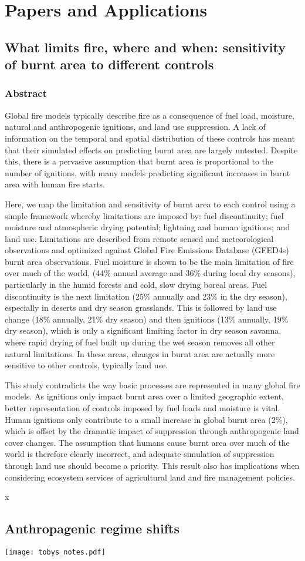 \section{Papers and Applications}

\subsection{What limits fire, where and when: sensitivity of burnt area to different controls}

\subsubsection{Abstract}
Global fire models typically describe fire as a consequence of fuel load, moisture, natural and anthropogenic
ignitions, and land use suppression. A lack of information on the temporal and spatial distribution of these
controls has meant that their simulated effects on predicting burnt area are largely untested. Despite this,
there is a pervasive assumption that burnt area is proportional to the number of ignitions, with many models
predicting significant increases in burnt area with human fire starts.


Here, we map the limitation and sensitivity of burnt area to each control using a simple framework whereby
limitations are imposed by: fuel discontinuity; fuel moisture and atmospheric drying potential; lightning and
human ignitions; and land use. Limitations are described from remote sensed and meteorological
observations and optimized against Global Fire Emissions Database (GFED4s) burnt area observations.
Fuel moisture is shown to be the main limitation of fire over much of the world, (44\% annual average and
36\% during local dry seasons), particularly in the humid forests and cold, slow drying boreal areas. Fuel
discontinuity is the next limitation (25\% annually and 23\% in the dry season), especially in deserts and dry
season grasslands. This is followed by land use change (18\% annually, 21\% dry season) and then ignitions
(13\% annually, 19\% dry season), which is only a significant limiting factor in dry season savanna, where
rapid drying of fuel built up during the wet season removes all other natural limitations. In these areas,
changes in burnt area are actually more sensitive to other controls, typically land use.


This study contradicts the way basic processes are represented in many global fire models. As ignitions only
impact burnt area over a limited geographic extent, better representation of controls imposed by fuel loads
and moisture is vital. Human ignitions only contribute to a small increase in global burnt area (2\%), which is
offset by the dramatic impact of suppression through anthropogenic land cover changes. The assumption
that humans cause burnt area over much of the world is therefore clearly incorrect, and adequate simulation
of suppression through land use should become a priority. This result also has implications when considering
ecosystem services of agricultural land and fire management policies.

\pagebreak
x
\pagebreak
\subsection{Anthropagenic regime shifts}
\texttt{[image: tobys\_notes.pdf]}
